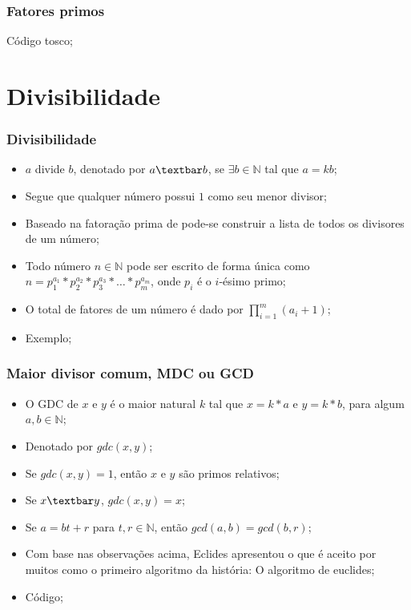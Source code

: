 \documentclass{beamer}
\begin{document}
\begin{frame}
    \frametitle{Fatores primos}

    \begin{center}
        \Huge Código tosco;
    \end{center}
\end{frame}

\section{Divisibilidade}
\begin{frame}
    \frametitle{Divisibilidade}

    \begin{itemize}
        \item $a$ divide $b$, denotado por $a \textbar b$, se $\exists b \in \mathbb{N}$ tal que $a = kb$;
        \item Segue que qualquer número possui $1$ como seu menor divisor;
        \item Baseado na fatoração prima de pode-se construir a lista de todos os divisores de um número;
        \item Todo número $n \in \mathbb{N}$ pode ser escrito de forma única como $n = p_1^{a_1} *p_2^{a_2} * p_3^{a_3} * \ldots * p_m^{a_m}$, onde $p_i$ é o $i$-ésimo primo;
        \item O total de fatores de um número é dado por $\prod_{i = 1}^m (a_i + 1)$;
        \item Exemplo;
    \end{itemize}
\end{frame}

\begin{frame}
    \frametitle{Maior divisor comum, MDC ou GCD}

    \begin{itemize}
        \item O GDC de $x$ e $y$ é o maior natural $k$ tal que $x=k*a$ e $y=k*b$, para algum $a,b \in \mathbb{N}$;
        \item Denotado por $gdc(x, y)$;
        \item Se $gdc(x, y) = 1$, então $x$ e $y$ são primos relativos;
        \item Se $x \textbar y$, $gdc(x, y) = x$;
        \item Se $a = bt + r$ para $t,r \in \mathbb{N}$, então $gcd(a, b) = gcd(b, r)$;
        \item Com base nas observações acima, Eclides apresentou o que é aceito por muitos como o primeiro algoritmo da história: O algoritmo de euclides;
        \item Código;
    \end{itemize}
\end{frame}
\end{document}
